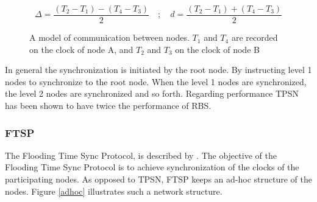 \documentclass[a4paper,12pt]{article}
\begin{document}
    $$\Delta = \frac{(T_2-T_1) - (T_4 - T_3)}{2} \quad ; \quad d = \frac{(T_2-T_1) + (T_4-T_3)}{2}$$
    
    \begin{figure}
        \centering
         \caption{A model of communication between nodes. $T_1$ and $T_4$ are recorded on the clock of node A, and $T_2$ and $T_3$ on the clock of node B}
        \label{timemeasuretpsn}
    \end{figure}
    
    In general the synchronization is initiated by the root node. By instructing level 1 nodes to synchronize to the root node. When the level 1 nodes are synchronized, the level 2 nodes are synchronized and so forth. Regarding performance TPSN has been shown to have twice the performance of RBS.
    
    
    \subsubsection{FTSP} %
    The Flooding Time Sync Protocol, is described by \citet{Maroti04}. The objective of the Flooding Time Sync Protocol is to achieve synchronization of the clocks of the participating nodes. As opposed to TPSN, FTSP keeps an ad-hoc structure of the nodes. Figure \ref{adhoc} illustrates such a network structure.
    
\end{document}
